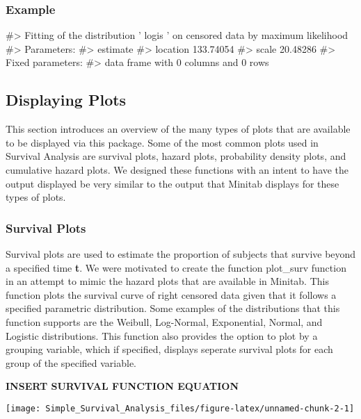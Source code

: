 \hypertarget{example}{%
\subsubsection{Example}\label{example}}

\begin{Schunk}
\begin{Soutput}
#> Fitting of the distribution ' logis ' on censored data by maximum likelihood 
#> Parameters:
#>           estimate
#> location 133.74054
#> scale     20.48286
#> Fixed parameters:
#> data frame with 0 columns and 0 rows
\end{Soutput}
\end{Schunk}

\hypertarget{displaying-plots}{%
\subsection{Displaying Plots}\label{displaying-plots}}

This section introduces an overview of the many types of plots that are
available to be displayed via this package. Some of the most common
plots used in Survival Analysis are survival plots, hazard plots,
probability density plots, and cumulative hazard plots. We designed
these functions with an intent to have the output displayed be very
similar to the output that Minitab displays for these types of plots.

\hypertarget{survival-plots}{%
\subsubsection{Survival Plots}\label{survival-plots}}

Survival plots are used to estimate the proportion of subjects that
survive beyond a specified time \textbf{t}. We were motivated to create
the function plot\_surv function in an attempt to mimic the hazard plots
that are available in Minitab. This function plots the survival curve of
right censored data given that it follows a specified parametric
distribution. Some examples of the distributions that this function
supports are the Weibull, Log-Normal, Exponential, Normal, and Logistic
distributions. This function also provides the option to plot by a
grouping variable, which if specified, displays seperate survival plots
for each group of the specified variable.

\textbf{INSERT SURVIVAL FUNCTION EQUATION}

\begin{Schunk}

\texttt{[image: Simple\_Survival\_Analysis\_files/figure-latex/unnamed-chunk-2-1]} \end{Schunk}

